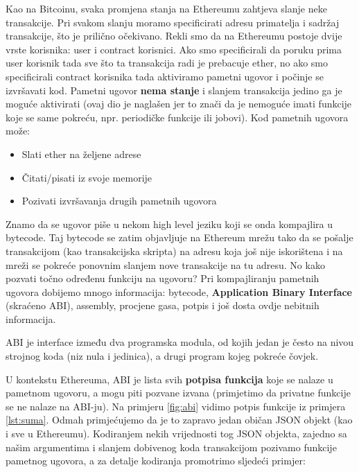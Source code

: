 \documentclass[a4paper,oneside,12pt]{memoir} %
\begin{document}
Kao na Bitcoinu, svaka promjena stanja na Ethereumu zahtjeva slanje neke transakcije. Pri svakom slanju moramo specificirati adresu primatelja i sadržaj transakcije, što je prilično očekivano. Rekli smo da na Ethereumu postoje dvije vrste korisnika: user i contract korisnici. Ako smo specificirali da poruku prima user korisnik tada sve što ta transakcija radi je prebacuje ether, no ako smo specificirali contract korisnika tada aktiviramo pametni ugovor i počinje se izvršavati kod. Pametni ugovor \textbf{nema stanje} i slanjem transakcija jedino ga je moguće aktivirati (ovaj dio je naglašen jer to znači da je nemoguće imati funkcije koje se same pokreću, npr. periodičke funkcije ili jobovi). Kod pametnih ugovora može:

\begin{itemize}
    \item Slati ether na željene adrese
    \item Čitati/pisati iz svoje memorije
    \item Pozivati izvršavanja drugih pametnih ugovora
\end{itemize}

Znamo da se ugovor piše u nekom high level jeziku koji se onda kompajlira u bytecode. Taj bytecode se zatim objavljuje na Ethereum mrežu tako da se pošalje transakcijom (kao transakcijska skripta) na adresu koja još nije iskorištena i na mreži se pokreće ponovnim slanjem nove transakcije na tu adresu. No kako pozvati točno određenu funkciju na ugovoru? Pri kompajliranju pametnih ugovora dobijemo mnogo informacija: bytecode,  \textbf{Application Binary Interface} (skraćeno ABI), assembly, procjene gasa, potpis i još dosta ovdje nebitnih informacija.

\begin{definicija}
ABI je interface između dva programska modula, od kojih jedan je često na nivou strojnog koda (niz nula i jedinica), a drugi program kojeg pokreće čovjek. 
\end{definicija}

U kontekstu Ethereuma, ABI je lista svih \textbf{potpisa funkcija} koje se nalaze u pametnom ugovoru, a mogu piti pozvane izvana (primjetimo da privatne funkcije se ne nalaze na ABI-ju). Na primjeru \ref{fig:abi} vidimo potpis funkcije iz primjera \ref{lst:suma}. Odmah primjećujemo da je to zapravo jedan običan JSON objekt (kao i sve u Ethereumu). Kodiranjem nekih vrijednosti tog JSON objekta, zajedno sa našim argumentima i slanjem dobivenog koda transakcijom pozivamo funkcije pametnog ugovora, a za detalje kodiranja promotrimo sljedeći primjer:
\end{document}
